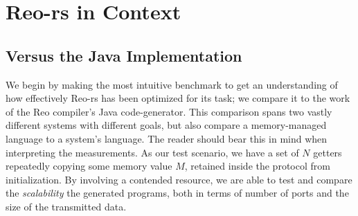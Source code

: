 \section{Reo-rs in Context}

\subsection{Versus the Java Implementation}
We begin by making the most intuitive benchmark to get an understanding of how effectively Reo-rs has been optimized for its task; we compare it to the work of the Reo compiler's Java code-generator. This comparison spans two vastly different systems with different goals, but also compare a memory-managed language to a system's language. The reader should bear this in mind when interpreting the measurements. As our test scenario, we have a set of $N$ getters repeatedly copying some memory value $M$, retained inside the protocol from initialization. By involving a contended resource, we are able to test and compare the \textit{scalability} the generated programs, both in terms of number of ports and the size of the transmitted data.

